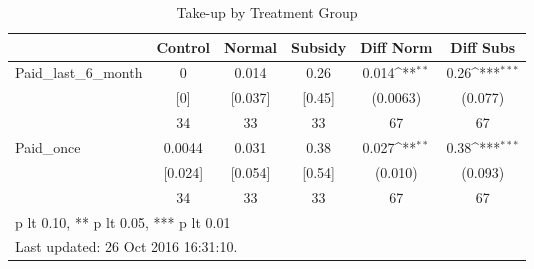 \begin{table}[htbp]\centering
\def\sym#1{\ifmmode^{#1}\else\(^{#1}\)\fi}
\caption{Take-up by Treatment Group \label{tab:"balance"}}
\begin{tabular*}{0.9\hsize}{@{\hskip\tabcolsep\extracolsep\fill}l*{1}{ccccc}}
\toprule
                                &  Control&   Normal&  Subsidy&Diff Norm         &Diff Subs         \\
\midrule
Paid\_last\_6\_month               &        0&    0.014&     0.26&    0.014\sym{**} &     0.26\sym{***}\\
                                &      [0]&  [0.037]&   [0.45]& (0.0063)         &  (0.077)         \\
                                &       34&       33&       33&       67         &       67         \\
Paid\_once                       &   0.0044&    0.031&     0.38&    0.027\sym{**} &     0.38\sym{***}\\
                                &  [0.024]&  [0.054]&   [0.54]&  (0.010)         &  (0.093)         \\
                                &       34&       33&       33&       67         &       67         \\
\bottomrule
\multicolumn{6}{l}{\footnotesize * p lt 0.10, ** p lt 0.05, *** p lt 0.01}\\
\multicolumn{6}{l}{\footnotesize Last updated: 26 Oct 2016 16:31:10.}\\
\end{tabular*}
\end{table}
